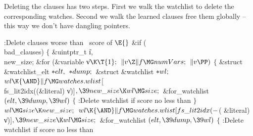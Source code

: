 {{{{{Deleting the clauses has two steps. First we walk the watchlist to
delete the
corresponding watches. Second we walk the learned clauses free them globally --
this way we don't have dangling pointers.

\Y\B\4:Delete clauses worse than \LBD\ score of \X${}%
\E{}$\6
\&{if} (\\{bad\_clauses})\5
${}\{{}$\1\6
\&{uintptr\_t} \|i${},{}$ \\{new\_size};\7
\&{for} (\&{variable} \|v${}\K\T{1};{}$ ${}\|v\Z\|f\MG\\{numVars};{}$ ${}\|v%
\PP){}$\5
${}\{{}$\1\6
\&{struct} \&{watchlist\_elt} ${}{*}\\{elt},{}$ ${}{*}\\{dump};{}$\6
\&{struct} \&{watchlist} ${}{*}\\{wl};{}$\7
${}\\{wl}\K{\AND}\|f\MG\\{watches}.\\{wlist}{}$[\\{fs\_lit2idx}((\&{literal}) %
\|v)]${},\39\\{new\_size}\K\\{wl}\MG\\{size};{}$\6
\&{for\_watchlist} ${}(\\{elt},\39\\{dump},\39\\{wl}){}$\5
${}\{{}$\1\6
:Delete watchlist  if score no less than \X%
\6
\4${}\}{}$\2\6
${}\\{wl}\MG\\{size}\K\\{new\_size};{}$\6
${}\\{wl}\K{\AND}\|f\MG\\{watches}.\\{wlist}[\\{fs\_lit2idx}({-}{}$(%
\&{literal}) \|v)]${},\39\\{new\_size}\K\\{wl}\MG\\{size};{}$\6
\&{for\_watchlist} ${}(\\{elt},\39\\{dump},\39\\{wl}){}$\5
${}\{{}$\1\6
:Delete watchlist  if score no less than \X%
}}}}}
